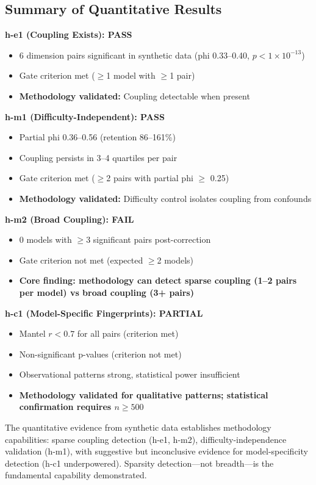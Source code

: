 \subsection{Summary of Quantitative Results}

\textbf{h-e1 (Coupling Exists): PASS}
\begin{itemize}
\item 6 dimension pairs significant in synthetic data (phi 0.33--0.40, $p < 1\times10^{-13}$)
\item Gate criterion met ($\geq$1 model with $\geq$1 pair)
\item \textbf{Methodology validated:} Coupling detectable when present
\end{itemize}

\textbf{h-m1 (Difficulty-Independent): PASS}
\begin{itemize}
\item Partial phi 0.36--0.56 (retention 86--161\%)
\item Coupling persists in 3--4 quartiles per pair
\item Gate criterion met ($\geq$2 pairs with partial phi $\geq$ 0.25)
\item \textbf{Methodology validated:} Difficulty control isolates coupling from confounds
\end{itemize}

\textbf{h-m2 (Broad Coupling): FAIL}
\begin{itemize}
\item 0 models with $\geq$3 significant pairs post-correction
\item Gate criterion not met (expected $\geq$2 models)
\item \textbf{Core finding: methodology can detect sparse coupling (1--2 pairs per model) vs broad coupling (3+ pairs)}
\end{itemize}

\textbf{h-c1 (Model-Specific Fingerprints): PARTIAL}
\begin{itemize}
\item Mantel $r < 0.7$ for all pairs (criterion met)
\item Non-significant p-values (criterion not met)
\item Observational patterns strong, statistical power insufficient
\item \textbf{Methodology validated for qualitative patterns; statistical confirmation requires $n \geq 500$}
\end{itemize}

The quantitative evidence from synthetic data establishes methodology capabilities: sparse coupling detection (h-e1, h-m2), difficulty-independence validation (h-m1), with suggestive but inconclusive evidence for model-specificity detection (h-c1 underpowered). Sparsity detection---not breadth---is the fundamental capability demonstrated.
